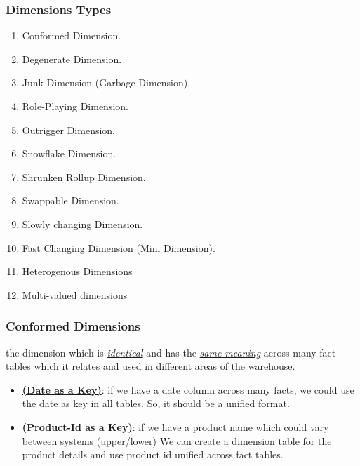 \begin{frame}
\frametitle{Dimensions Types}
	\begin{enumerate}[<+->]
		\item Conformed Dimension.
		\item Degenerate Dimension.
		\item Junk Dimension (Garbage Dimension).
		\item Role-Playing Dimension.
		\item Outrigger Dimension.
		\item Snowflake Dimension.
		\item Shrunken Rollup Dimension.
		\item Swappable Dimension.
		\item Slowly changing Dimension.
		\item Fast Changing Dimension (Mini Dimension).
		\item Heterogenous Dimensions
		\item Multi-valued dimensions
	\end{enumerate}
\end{frame}
\VideoClassification[column=1, colour=blue]
\begin{frame}
    \frametitle{Conformed Dimensions}
    \begin{description}[<+->]
        \item[Conformed Dimensions]    the dimension which is \underline{\textit{identical}} and has the \underline{\textit{same meaning}} across many fact tables which it relates and used in different areas of the warehouse.
        \begin{example}
            \begin{itemize}[<+->]
                \item \underline{\textbf{(Date as a Key)}}: if we have a date column across many facts, we could use the date as key in all tables. So, it should be a unified format.
                \item \underline{\textbf{(Product-Id as a Key)}}: if we have a product name which could vary between systems
                \forexample (upper/lower) We can create a dimension table for the product details and use product id unified across fact tables.
            \end{itemize}
        \end{example}
    \end{description}
\end{frame}
